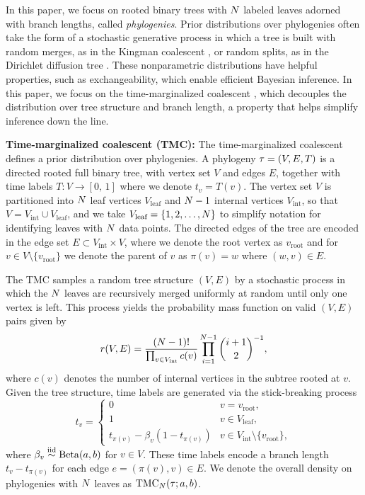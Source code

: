 In this paper, we focus on
rooted binary trees with $N$ labeled leaves 
adorned with branch lengths,
called \emph{phylogenies}.
Prior distributions over phylogenies
often take the form of a stochastic generative
process in which a tree is built
with random merges, as in the Kingman coalescent \citep{Kingman1982},
or random splits, as in the Dirichlet diffusion tree \citep{Neal2003}.
These nonparametric distributions have
helpful properties, such as exchangeability,
which enable efficient Bayesian inference.
In this paper, we focus on the time-marginalized
coalescent \citep[TMC; ][]{Boyles2012}, which decouples the
distribution over tree structure and branch length,
a property that helps simplify inference down the line.

\textbf{Time-marginalized coalescent (TMC):}
The time-marginalized coalescent defines a prior distribution over phylogenies.
A phylogeny $\tau = (V, E, T)$ is a directed rooted full binary tree, with vertex set $V$ and edges $E$, together with time labels $T: V \to [0, \, 1]$ where we denote $t_v = T(v)$.
The vertex set $V$ is partitioned into $N$ leaf vertices $V_\text{leaf}$ and $N-1$ internal vertices $V_\text{int}$, so that $V = V_\text{int} \cup V_\text{leaf}$, and we take $V_\text{leaf} = \{1, 2, \ldots, N\}$ to simplify notation for identifying leaves with $N$ data points.
The directed edges of the tree are encoded in the edge set $E \subset V_\text{int} \times V$, where we denote the root vertex as $v_\text{root}$ and for $v \in V \setminus \{v_\text{root}\}$ we denote the parent of $v$ as $\pi(v) = w$ where $(w, v) \in E$.

The TMC samples a random tree structure $(V, E)$ by a stochastic process in which the $N$ leaves are recursively merged uniformly at random until only one vertex is left.
This process yields the probability mass function on valid $(V, E)$ pairs given by
\begin{equation}
    r(V, E) = \frac{(N - 1)!}{\prod_{v \in V_\text{int}} c(v)} \prod_{i = 1}^{N-1} {i+1 \choose 2}^{-1},
\end{equation}
where $c(v)$ denotes the number of internal vertices in the subtree rooted at $v$.
Given the tree structure, time labels are generated via the stick-breaking process
\begin{equation}
    t_v = \begin{cases} 0 & v = v_\text{root}, \\ 1 & v \in V_\text{leaf}, \\ t_{\pi(v)} - \beta_v (1 - t_{\pi(v)}) & v \in V_\text{int} \setminus \{v_\text{root}\}, \end{cases}
\end{equation}
where $\beta_v \stackrel{\mathrm{iid}}{\sim} \mathrm{Beta}(a, b)$ for $v \in V$. These time labels encode a branch length $t_v - t_{\pi(v)}$ for each edge $e = (\pi(v), v) \in E$. We denote the overall density on phylogenies with $N$ leaves as $\mathrm{TMC}_N(\tau; a, b)$.


